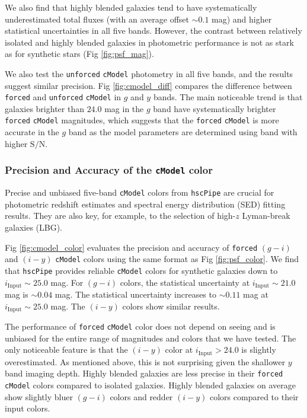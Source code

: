 \documentclass[useamsfonts]{pasj01}
\def\hscpipe{\texttt{hscPipe}}
\def\cmodel{\texttt{cModel}}
\def\forced{\texttt{forced}}
\def\unforced{\texttt{unforced}}
\def\s2n{{$\mathrm{S}/\mathrm{N}$}}
\begin{document}
    We also find that highly blended galaxies tend to have systematically 
    underestimated total fluxes (with an average offset ${\sim}0.1$ mag) and 
    higher statistical uncertainties in all five bands. 
    However, the contrast between relatively isolated and highly blended galaxies
    in photometric performance is not as stark as for synthetic stars 
    (Fig \ref{fig:psf_mag}).

    We also test the \unforced{} \cmodel{} photometry in all five bands, and the
    results suggest similar precision.
    Fig \ref{fig:cmodel_diff} compares the difference between \forced{} and \unforced{} 
    \cmodel{} in $g$ and $y$ bands.  
    The main noticeable trend is that galaxies brighter than $24.0$ mag in the $g$ band 
    have systematically brighter \forced{} \cmodel{} magnitudes, which suggests that 
    the \forced{} \cmodel{} is more accurate in the $g$ band as the model parameters 
    are determined using band with higher \s2n{}.

\subsubsection{Precision and Accuracy of the \cmodel{} color}

    Precise and unbiased five-band \cmodel{} colors from \hscpipe{} are crucial for
    photometric redshift estimates and spectral energy distribution (SED) fitting 
    results. 
    They are also key, for example, to the selection of high-$z$ Lyman-break 
    galaxies (LBG).

    Fig \ref{fig:cmodel_color} evaluates the precision and accuracy of \forced{} 
    $(g-i)$ and $(i-y)$ \cmodel{} colors using the same format as 
    Fig \ref{fig:psf_color}. 
    We find that \hscpipe{} provides reliable \cmodel{} colors for synthetic 
    galaxies down to $i_{\mathrm{Input}}{\sim}25.0$ mag.
    For $(g-i)$ colors, the statistical uncertainty at $i_{\mathrm{Input}}{\sim}21.0$ 
    mag is ${\sim}0.04$ mag.
    The statistical uncertainty increases to ${\sim}0.11$ mag at 
    $i_{\mathrm{Input}}{\sim}25.0$ mag.
    The $(i-y)$ colors show similar results. 

    The performance of \forced{} \cmodel{} color does not depend on seeing and is 
    unbiased for the entire range of magnitudes and colors that we have tested.
    The only noticeable feature is that the $(i-y)$ color at $i_{\mathrm{Input}}>24.0$ 
    is slightly overestimated.
    As mentioned above, this is not surprising given the shallower $y$ band 
    imaging depth. 
    Highly blended galaxies are less precise in their \forced{} \cmodel{} colors 
    compared to isolated galaxies.  
    Highly blended galaxies on average show slightly bluer $(g-i)$ colors and redder  
    $(i-y)$ colors compared to their input colors.
\end{document}

